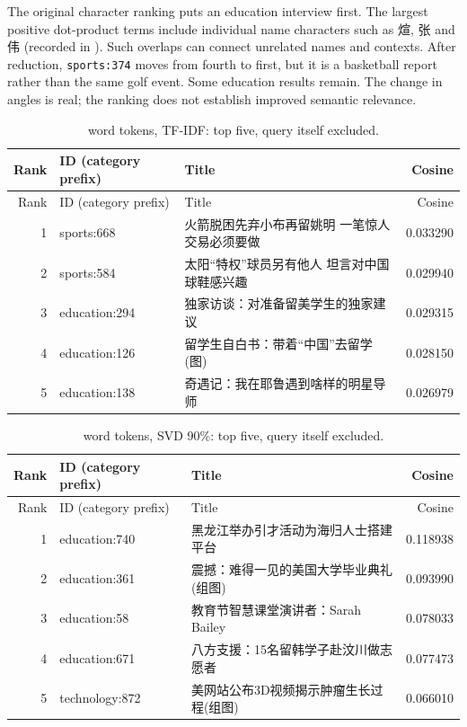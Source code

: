 \documentclass[11pt]{article}
\renewcommand{\arraystretch}{1.15}
\begin{document}
The original character ranking puts an education interview first.
The largest positive dot-product terms include individual name characters
such as 煊, 张 and 伟 (recorded in ).
Such overlaps can connect unrelated names and contexts.
After reduction, \texttt{sports:374} moves from fourth to first, but it
is a basketball report rather than the same golf event.
Some education results remain. The change in angles is real;
the ranking does not establish improved semantic relevance.
{\small\renewcommand{\arraystretch}{1.05}
\begin{longtable}{rp{}p{}r}
\caption{word tokens, TF-IDF: top five, query itself excluded.}\\
\toprule
Rank & ID (category prefix) & Title & Cosine \\ \midrule\endfirsthead
\toprule
Rank & ID (category prefix) & Title & Cosine \\ \midrule\endhead
1 & sports:668 & 火箭脱困先弃小布再留姚明 一笔惊人交易必须要做 & 0.033290 \\
2 & sports:584 & 太阳“特权”球员另有他人 坦言对中国球鞋感兴趣 & 0.029940 \\
3 & education:294 & 独家访谈：对准备留美学生的独家建议 & 0.029315 \\
4 & education:126 & 留学生自白书：带着“中国”去留学(图) & 0.028150 \\
5 & education:138 & 奇遇记：我在耶鲁遇到啥样的明星导师 & 0.026979 \\
\bottomrule
\end{longtable}
}

{\small\renewcommand{\arraystretch}{1.05}
\begin{longtable}{rp{}p{}r}
\caption{word tokens, SVD 90\%: top five, query itself excluded.}\\
\toprule
Rank & ID (category prefix) & Title & Cosine \\ \midrule\endfirsthead
\toprule
Rank & ID (category prefix) & Title & Cosine \\ \midrule\endhead
1 & education:740 & 黑龙江举办引才活动为海归人士搭建平台 & 0.118938 \\
2 & education:361 & 震撼：难得一见的美国大学毕业典礼(组图) & 0.093990 \\
3 & education:58 & 教育节智慧课堂演讲者：Sarah Bailey & 0.078033 \\
4 & education:671 & 八方支援：15名留韩学子赴汶川做志愿者 & 0.077473 \\
5 & technology:872 & 美网站公布3D视频揭示肿瘤生长过程(组图) & 0.066010 \\
\bottomrule
\end{longtable}
}
\end{document}
